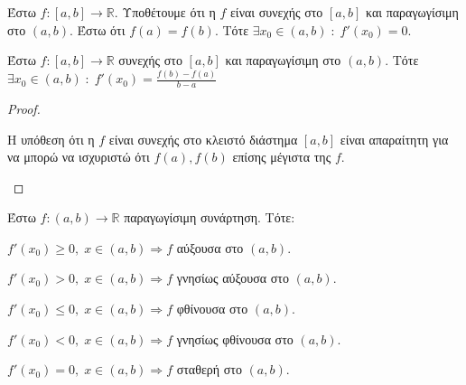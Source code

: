 \documentclass[a4paper,table]{report}
\begin{document}
\begin{thm}[Rolle]
  Έστω $ f \colon [a,b] \to \mathbb{R} $. Υποθέτουμε ότι η $ f $ είναι συνεχής 
  στο $ [a,b] $ και παραγωγίσιμη στο $ (a,b) $. Έστω ότι $ f(a)=f(b) $. Τότε
  $ \exists x_{0} \in (a,b) \; : \; f'(x_{0}) = 0 $.
\end{thm}


\begin{thm}
  Έστω $ f \colon [a,b] \to \mathbb{R} $ συνεχής στο $ [a,b] $ και παραγωγίσιμη 
  στο $ (a,b) $. Τότε $ \exists x_{0} \in (a,b) \; : \; f'(x_{0}) = 
  \frac{f(b)-f(a)}{b-a} $
\end{thm}

\begin{proof}
  \begin{rem}
    Η υπόθεση ότι η $f$ είναι συνεχής στο κλειστό διάστημα $ [a,b] $ είναι 
    απαραίτητη για να μπορώ να ισχυριστώ ότι $ f(a), f(b) $ επίσης 
    μέγιστα της $f$.
  \end{rem}   
\end{proof}

\begin{thm}
  Έστω $ f \colon (a,b) \to \mathbb{R} $ παραγωγίσιμη συνάρτηση. Τότε:
  \begin{myitemize}
    \item $ f'(x_{0}) \geq 0, \; x \in (a,b) \Rightarrow f $ αύξουσα στο $ (a,b) $.
    \item $ f'(x_{0}) > 0, \; x \in (a,b) \Rightarrow f $ γνησίως αύξουσα στο 
      $ (a,b) $.
    \item $ f'(x_{0}) \leq 0, \; x \in (a,b) \Rightarrow f $ φθίνουσα στο $ (a,b) $.
    \item $ f'(x_{0}) < 0, \; x \in (a,b) \Rightarrow f$ γνησίως φθίνουσα στο 
      $ (a,b) $.
    \item $ f'(x_{0}) = 0, \; x \in (a,b) \Rightarrow f $ σταθερή στο $ (a,b) $.
  \end{myitemize}
\end{thm}
\end{document}
